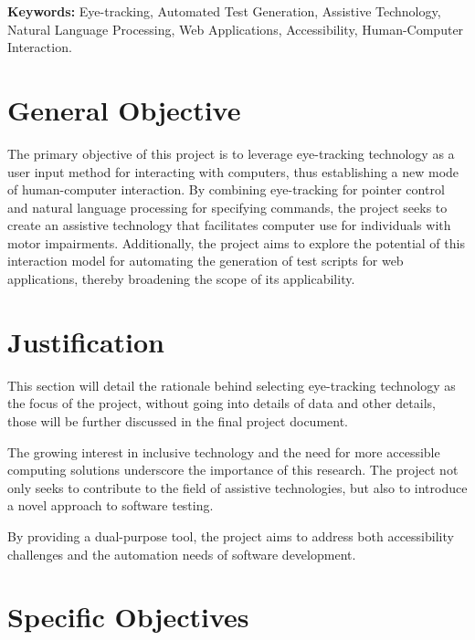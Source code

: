 \documentclass[letterpaper, 12pt]{article}
\begin{document}
\noindent\textbf{Keywords:} Eye-tracking, Automated Test Generation, Assistive Technology, Natural Language Processing, Web Applications, Accessibility, Human-Computer Interaction.



\pagebreak

\section{General Objective}


The primary objective of this project is to leverage eye-tracking technology as a user input method for interacting with computers, thus establishing a new mode of human-computer interaction. By combining eye-tracking for pointer control and natural language processing for specifying commands, the project seeks to create an assistive technology that facilitates computer use for individuals with motor impairments. Additionally, the project aims to explore the potential of this interaction model for automating the generation of test scripts for web applications, thereby broadening the scope of its applicability. 


\section{Justification}

This section will detail the rationale behind selecting eye-tracking technology as the focus of the project, without going into details of data and other details, those will be further discussed in the final project document. 
\newline

\noindent The growing interest in inclusive technology and the need for more accessible computing solutions underscore the importance of this research. The project not only seeks to contribute to the field of assistive technologies, but also to introduce a novel approach to software testing. 
\newline

\noindent By providing a dual-purpose tool, the project aims to address both accessibility challenges and the automation needs of software development.
\newline


\section{Specific Objectives}
\end{document}
